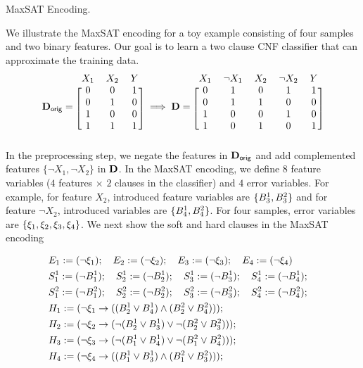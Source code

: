 \begin{example}{MaxSAT Encoding.}
\normalfont

We illustrate the MaxSAT encoding for a toy example consisting of four samples and two binary features. Our goal is to learn a two clause CNF classifier that can approximate the training data. 
\[ 
\dataset_\mathsf{orig} = 
\begin{blockarray}{ccc}
X_1 & X_2 & Y\\
\begin{block}{[ccc]}
0 & 0 & 1\\
0 & 1 & 0\\
1 & 0 & 0\\
1 & 1 & 1\\
\end{block}
\end{blockarray} \implies 
\dataset = 
\begin{blockarray}{ccccc}
X_1 & \neg X_1 & X_2  & \neg X_2 & Y\\
\begin{block}{[ccccc]}
0 & 1 & 0 & 1 & 1\\
0 & 1 & 1 & 0 & 0\\
1 & 0 & 0 & 1 & 0\\
1 & 0 & 1 & 0 & 1\\
\end{block}
\end{blockarray}
\]
In the preprocessing step, we negate the features in $ \mathbf{D}_\mathsf{orig} $ and add complemented features $ \{\neg X_1, \neg X_2\} $ in $ \mathbf{D} $. In the MaxSAT encoding, we define $ 8 $ feature variables ($ 4 $ features $ \times $ $ 2 $ clauses in the classifier) and $ 4 $ error variables. For example, for feature $ X_2 $, introduced feature variables are $ \{B^1_3, B^2_3\} $ and for feature $ \neg X_2 $, introduced variables are $ \{B^1_4, B^2_4\} $. For four samples, error variables are $ \{\xi_1, \xi_2, \xi_3, \xi_4\} $. We next show the soft and hard clauses in the MaxSAT encoding


\[
\begin{split}
&E_1:= (\neg \xi_1); \quad
E_2:= (\neg \xi_2); \quad E_3:= (\neg \xi_3); \quad
E_4:= (\neg \xi_4)\\
& S_1^1 := (\neg B_1^1);\quad 
 S^1_2 := (\neg B^1_2);\quad 
 S^1_3 := (\neg B^1_3);\quad
 S^1_4 := (\neg B^1_4);\quad \\ 
& S_1^2 := (\neg B_1^2);\quad 
S^2_2 := (\neg B^2_2);\quad 
S^2_3 := (\neg B^2_3);\quad 
S^2_4 := (\neg B^2_4);\quad\\ 
& H_1:= (\neg \xi_1 \rightarrow ((B_2^1 \vee B_4^1)\wedge (B_2^2 \vee B_4^2)));\\
& H_2:= (\neg \xi_2 \rightarrow (\neg(B_2^1 \vee B_3^1) \vee \neg(B_2^2 \vee B_3^2)));\\
& H_3:= (\neg \xi_3 \rightarrow (\neg (B_1^1 \vee B_4^1) \vee \neg(B_1^2 \vee B_4^2)));\\
& H_4:= (\neg \xi_4 \rightarrow ((B_1^1 \vee B_3^1) \wedge (B_1^2 \vee B_3^2)));\\
\end{split}
\]


\end{example}
